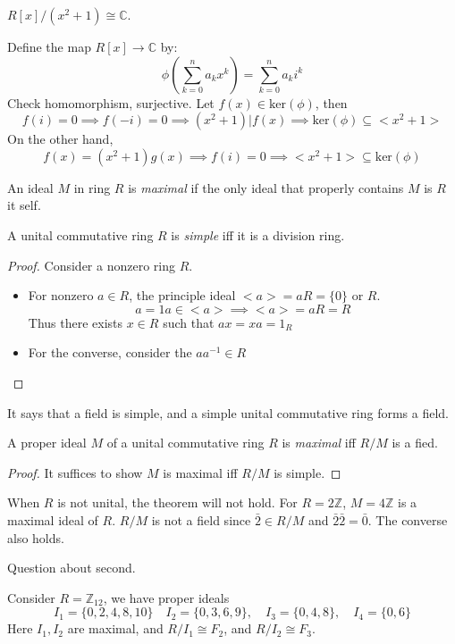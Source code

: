 \begin{example}
$R[x]/(x^2+1)\cong\mathbb{C}$.

Define the map $R[x]\to\mathbb{C}$ by:
\[
\phi(\sum_{k=0}^na_kx^k)=\sum_{k=0}^na_ki^k
\]
Check homomorphism, surjective. Let $f(x)\in\mbox{ker}(\phi)$, then
\[
f(i)=0\implies f(-i)=0\implies (x^2+1)|f(x)\implies\mbox{ker}(\phi)\subseteq<x^2+1>
\]
On the other hand,
\[
f(x)=(x^2+1)g(x)\implies f(i)=0\implies <x^2+1>\subseteq\mbox{ker}(\phi)
\]
\end{example}

\begin{definition}[Maximal]
An ideal $M$ in ring $R$ is \emph{maximal} if the only ideal that properly contains $M$ is $R$ it self.
\end{definition}
\begin{proposition}
A unital commutative ring $R$ is \emph{simple} iff it is a division ring.
\end{proposition}
\begin{proof}
Consider a nonzero ring $R$.
\begin{itemize}
\item
For nonzero $a\in R$, the principle ideal $<a>=aR=\{0\}$ or $R$.
\[
a=1a\in<a>\implies <a>=aR=R
\]
Thus there exists $x\in R$ such that $ax=xa=1_R$
\item
For the converse, consider the $aa^{-1}\in R$
\end{itemize}
\end{proof}
\begin{remark}
It says that a field is simple, and a simple unital commutative ring forms a field.
\end{remark}

\begin{theorem}
A proper ideal $M$ of a unital commutative ring $R$ is \emph{maximal} iff $R/M$ is a fied.
\end{theorem}
\begin{proof}
It suffices to show $M$ is maximal iff $R/M$ is simple. 
\end{proof}
\begin{remark}
When $R$ is not unital, the theorem will not hold. For $R=2\mathbb{Z}$, $M=4\mathbb{Z}$ is a maximal ideal of $R$. $R/M$ is not a field since $\bar 2\in R/M$ and $\bar 2\bar 2=\bar 0$. The converse also holds.
\end{remark}
Question about second.
\begin{remark}
Consider $R=\mathbb{Z}_{12}$, we have proper ideals
\[
I_1=\{0,2,4,8,10\}
\quad
I_2=\{0,3,6,9\},\quad
I_3=\{0,4,8\},\quad
I_4=\{0,6\}
\]
Here $I_1,I_2$ are maximal, and $R/I_1\cong F_2$, and $R/I_2\cong F_3$.
\end{remark}

